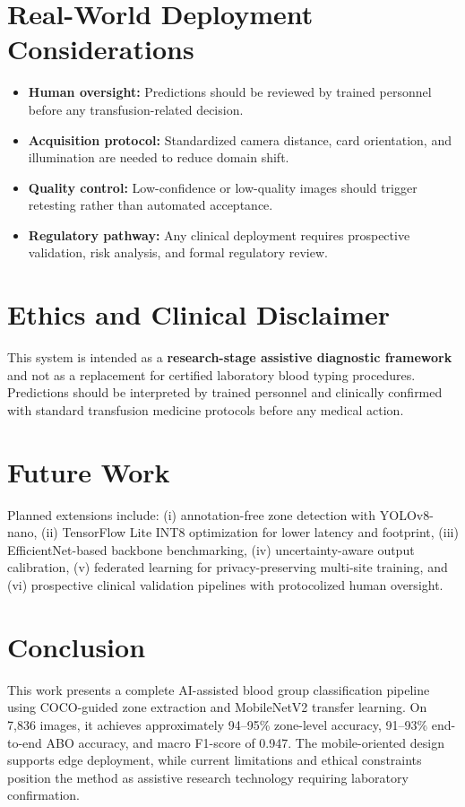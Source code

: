 \documentclass[conference]{IEEEtran}
\begin{document}
\section{Real-World Deployment Considerations}
\begin{itemize}
  \item \textbf{Human oversight:} Predictions should be reviewed by trained personnel before any transfusion-related decision.
  \item \textbf{Acquisition protocol:} Standardized camera distance, card orientation, and illumination are needed to reduce domain shift.
  \item \textbf{Quality control:} Low-confidence or low-quality images should trigger retesting rather than automated acceptance.
  \item \textbf{Regulatory pathway:} Any clinical deployment requires prospective validation, risk analysis, and formal regulatory review.
\end{itemize}

\section{Ethics and Clinical Disclaimer}
This system is intended as a \textbf{research-stage assistive diagnostic framework} and not as a replacement for certified laboratory blood typing procedures. Predictions should be interpreted by trained personnel and clinically confirmed with standard transfusion medicine protocols before any medical action.

\section{Future Work}
Planned extensions include: (i) annotation-free zone detection with YOLOv8-nano, (ii) TensorFlow Lite INT8 optimization for lower latency and footprint, (iii) EfficientNet-based backbone benchmarking, (iv) uncertainty-aware output calibration, (v) federated learning for privacy-preserving multi-site training, and (vi) prospective clinical validation pipelines with protocolized human oversight.

\section{Conclusion}
This work presents a complete AI-assisted blood group classification pipeline using COCO-guided zone extraction and MobileNetV2 transfer learning. On 7,836 images, it achieves approximately 94--95\% zone-level accuracy, 91--93\% end-to-end ABO accuracy, and macro F1-score of 0.947. The mobile-oriented design supports edge deployment, while current limitations and ethical constraints position the method as assistive research technology requiring laboratory confirmation.
\end{document}
